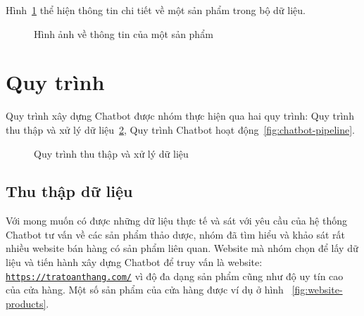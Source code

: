 \documentclass{article}
\numberwithin{equation}{section}
\numberwithin{equation}{section}
\begin{document}
Hình~\ref{fig:product-example} thể hiện thông tin chi tiết về một sản phẩm trong bộ dữ liệu.

\begin{figure}[!ht]
    \centering
    \caption{Hình ảnh về thông tin của một sản phẩm}
    \label{fig:product-example}
\end{figure}

\section{\textbf{Quy trình}}
Quy trình xây dựng Chatbot được nhóm thực hiện qua hai quy trình: Quy trình thu thập và xử lý dữ liệu~\ref{fig:data-pipeline}, Quy trình Chatbot hoạt động~\ref{fig:chatbot-pipeline}.
\begin{figure}[!ht]
    \centering
    \caption{Quy trình thu thập và xử lý dữ liệu}
    \label{fig:data-pipeline}
\end{figure}
\subsection{Thu thập dữ liệu}

Với mong muốn có được những dữ liệu thực tế và sát với yêu cầu của hệ thống Chatbot tư vấn về các sản phẩm thảo dược, nhóm đã tìm hiểu và khảo sát rất nhiều website bán hàng có sản phẩm liên quan. Website mà nhóm chọn để lấy dữ liệu và tiến hành xây dựng Chatbot để truy vấn là website: \texttt{\url{https://tratoanthang.com/}} vì độ đa dạng sản phẩm cũng như độ uy tín cao của cửa hàng. Một số sản phẩm của cửa hàng được ví dụ ở hình ~\ref{fig:website-products}.
\end{document}

